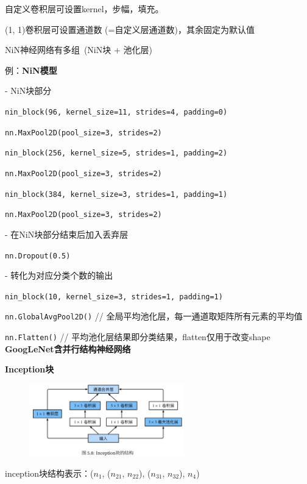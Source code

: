 \documentclass[UTF8]{ctexart}
\begin{document}
  \quad 自定义卷积层可设置kernel，步幅，填充。
  
  \quad (1, 1)卷积层可设置通道数 (=自定义层通道数)，其余固定为默认值

  NiN神经网络有多组\ (NiN块 + 池化层)
  
  例：\textbf{NiN模型}

  \quad - NiN块部分

  \quad \texttt{nin\_block(96, kernel\_size=11, strides=4, padding=0)}

  \quad \texttt{nn.MaxPool2D(pool\_size=3, strides=2)}

  \quad \texttt{nin\_block(256, kernel\_size=5, strides=1, padding=2)}

  \quad \texttt{nn.MaxPool2D(pool\_size=3, strides=2)}

  \quad \texttt{nin\_block(384, kernel\_size=3, strides=1, padding=1)}

  \quad \texttt{nn.MaxPool2D(pool\_size=3, strides=2)}

  \quad - 在NiN块部分结束后加入丢弃层

  \quad \texttt{nn.Dropout(0.5)}

  \quad - 转化为对应分类个数的输出

  \quad \texttt{nin\_block(10, kernel\_size=3, strides=1, padding=1)}

  \quad \texttt{nn.GlobalAvgPool2D()} // 全局平均池化层，每一通道取矩阵所有元素的平均值

  \quad \texttt{nn.Flatten()} // 平均池化层结果即分类结果，flatten仅用于改变shape\\
\textbf{GoogLeNet含并行结构神经网络}

  \textbf{Inception块}
  \begin{figure}[H] %
    \centering %
    \includegraphics[width=0.6\textwidth]{note_images/inception_block.png} %
  \end{figure}

  \quad inception块结构表示：($n_1$, ($n_{21}$, $n_{22}$), ($n_{31}$, $n_{32}$), $n_4$) 
  
\end{document}
